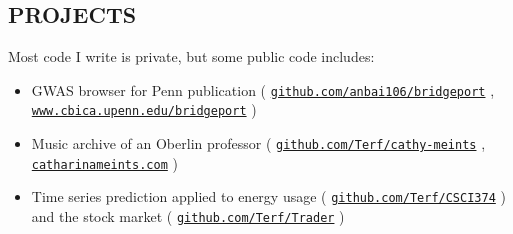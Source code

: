 \documentclass[margin]{res}
\newcommand\rurl[1]{%
  \href{http://#1}{\nolinkurl{#1}}%
}
\begin{document}
\begin{resume}
\section{PROJECTS}
Most code I write is private, but some public code includes:
\begin{itemize}
    \item GWAS browser for Penn publication (\rurl{github.com/anbai106/bridgeport},\\ \rurl{www.cbica.upenn.edu/bridgeport})
    \item Music archive of an Oberlin professor (\rurl{github.com/Terf/cathy-meints},\\ \rurl{catharinameints.com})
    \item Time series prediction applied to energy usage (\rurl{github.com/Terf/CSCI374}) and the stock market (\rurl{github.com/Terf/Trader})
\end{itemize}





\end{resume}
\end{document}
